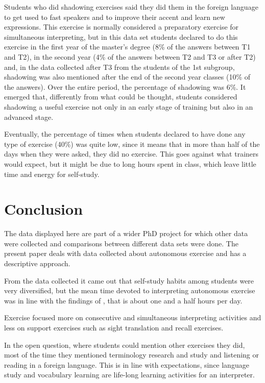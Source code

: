 \documentclass[output=paper]{../langscibook}
\begin{document}
Students who did shadowing exercises said they did them in the foreign language to get used to fast speakers and to improve their accent and learn new expressions. This exercise is normally considered a preparatory exercise for simultaneous interpreting, but in this data set students declared to do this exercise in the first year of the master’s degree (8\% of the answers between T1 and T2), in the second year (4\% of the answers between T2 and T3 or after T2) and, in the data collected after T3 from the students of the 1st subgroup, shadowing was also mentioned after the end of the second year classes (10\% of the answers). Over the entire period, the percentage of shadowing was 6\%. It emerged that, differently from what could be thought, students considered shadowing a useful exercise not only in an early stage of training but also in an advanced stage.

Eventually, the percentage of times when students declared to have done any type of exercise (40\%) was quite low, since it means that in more than half of the days when they were asked, they did no exercise. This goes against what trainers would expect, but it might be due to long hours spent in class, which leave little time and energy for self-study.


\section{Conclusion}


The data displayed here are part of a wider PhD project for which other data were collected and comparisons between different data sets were done. The present paper deals with data collected about autonomous exercise and has a descriptive approach.

From the data collected it came out that self-study habits among students were very diversified, but the mean time devoted to interpreting autonomous exercise was in line with the findings of \citet{Fan2012}, that is about one and a half hours per day.

Exercise focused more on consecutive and simultaneous interpreting activities and less on support exercises such as sight translation and recall exercises.

In the open question, where students could mention other exercises they did, most of the time they mentioned terminology research and study and listening or reading in a foreign language. This is in line with expectations, since language study and vocabulary learning are life-long learning activities for an interpreter.
\end{document}
